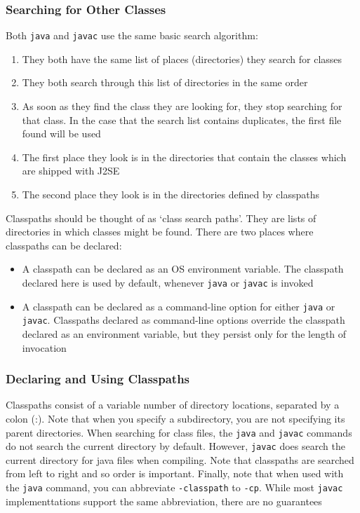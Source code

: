 \subsubsection{Searching for Other Classes}
Both \verb#java# and \verb#javac# use the same basic search algorithm:
\begin{enumerate}
    \item They both have the same list of places (directories) they search for 
    classes
    \item They both search through this list of directories in the same order
    \item As soon as they find the class they are looking for, they stop 
    searching for that class. In the case that the search list contains 
    duplicates, the first file found will be used
    \item The first place they look is in the directories that contain the 
    classes which are shipped with J2SE
    \item The second place they look is in the directories defined by 
    classpaths
\end{enumerate}
Classpaths should be thought of as `class search paths'. They are lists of 
directories in which classes might be found. There are two places where 
classpaths can be declared:
\begin{itemize}
    \item A classpath can be declared as an OS environment variable. The 
    classpath declared here is used by default, whenever \verb#java# or 
    \verb#javac# is invoked
    \item A classpath can be declared as a command-line option for either 
    \verb#java# or \verb#javac#. Classpaths declared as command-line options 
    override the classpath declared as an environment variable, but they 
    persist only for the length of invocation
\end{itemize}

\subsubsection{Declaring and Using Classpaths}
Classpaths consist of a variable number of directory locations, separated by a 
colon (:). Note that when you specify a subdirectory, you are not specifying 
its parent directories. When searching for class files, the \verb#java# and 
\verb#javac# commands do not search the current directory by default. However, 
\verb#javac# does search the current directory for java files when compiling.  
Note that classpaths are searched from left to right and so order is important. 
Finally, note that when used with the \verb#java# command, you can abbreviate 
\verb#-classpath# to \verb#-cp#. While most \verb#javac# implementtations 
support the same abbreviation, there are no guarantees

